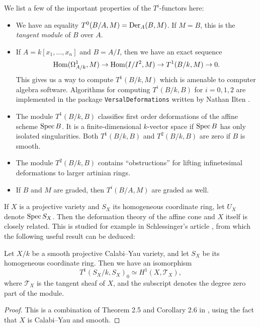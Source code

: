We list a few of the important properties of the $T^i$-functors here:

\begin{itemize}
	\item We have an equality $T^0(B/A,M) = \operatorname{Der}_A(B,M)$. If $M=B$, this is the \emph{tangent module} of $B$ over $A$.
	\item If $A=k[x_1,\ldots,x_n]$ and $B=A/I$, then we have an exact sequence
	\begin{equation}
	\label{eq:t1seq}
	\operatorname{Hom}(\Omega_{A/k}^1,M) \to \operatorname{Hom}(I/I^2,M) \to T^1(B/k,M) \to 0.
	\end{equation}
	This gives us a way to compute $T^1(B/k,M)$ which is amenable to computer algebra software. Algorithms for computing $T^i(B/k,B)$ for $i=0,1,2$ are implemented in the \MM package \texttt{VersalDeformations} written by Nathan Ilten \cite{ilten_versaldeformations}.
	\item The module $T^1(B/k,B)$ classifies first order deformations of the affine scheme $\operatorname{Spec} B$. It is a finite-dimensional $k$-vector space if $\operatorname{Spec} B$ has only isolated singularities. Both $T^1(B/k,B)$ and $T^2(B/k,B)$ are zero if $B$ is smooth.
	\item The module $T^2(B/k,B)$ contains ``obstructions'' for lifting infinetesimal deformations to larger artinian rings.
	\item If $B$ and $M$ are graded, then $T^i(B/A,M)$ are graded as well. 
\end{itemize}

If $X$ is a projective variety and $S_X$ its homogeneous coordinate ring, let $U_X$ denote $\operatorname{Spec} S_X$. Then the deformation theory of the affine cone and $X$ itself is closely related. This is studied for example in Schlessinger's article \cite{schlessinger_rigid}, from which the following useful result can be deduced:

\begin{proposition}
\label{prop:t1h1}
Let $X/k$ be a smooth projective Calabi--Yau variety, and let $S_X$ be its homogeneous coordinate ring. Then we have an isomorphism
$$
T^1(S_X/k,S_X)_0  \simeq H^1(X, \mathcal T_X),
$$
where $\mathcal T_X$ is the tangent sheaf of $X$, and the subscript denotes the degree zero part of the module.
\end{proposition}

\begin{proof}
This is a combination of Theorem 2.5 and Corollary 2.6 in \cite{t1_ref}, using the fact that $X$ is Calabi--Yau and smooth.
\end{proof}

